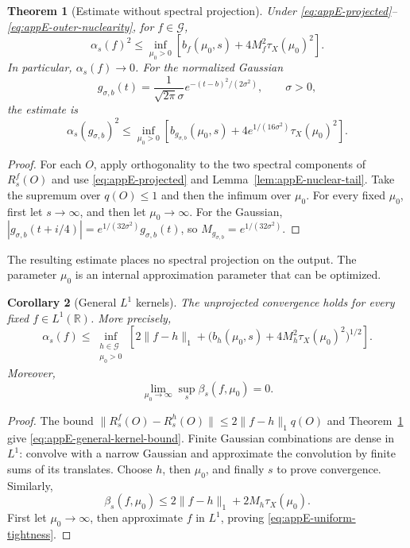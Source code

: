\documentclass[a4paper,11pt]{article}
\newtheorem{theorem}{Theorem}
\newtheorem{corollary}[theorem]{Corollary}
\theoremstyle{definition}
\begin{document}
\begin{theorem}[Estimate without spectral projection]
\label{thm:appE-uncut-bound}
Under \eqref{eq:appE-projected}--\eqref{eq:appE-outer-nuclearity}, for $f\in\mathcal G$,
\begin{equation}
 \alpha_s(f)^2\le
 \inf_{\mu_0>0}\left[
 b_f(\mu_0,s)+4M_f^2\tau_X(\mu_0)^2\right].
 \label{eq:appE-uncut-bound}
\end{equation}
In particular, $\alpha_s(f)\to0$. For the normalized Gaussian
\[
 g_{\sigma,b}(t)=\frac1{\sqrt{2\pi}\sigma}
 e^{-(t-b)^2/(2\sigma^2)},\qquad\sigma>0,
\]
the estimate is
\begin{equation}
 \alpha_s(g_{\sigma,b})^2\le
 \inf_{\mu_0>0}\left[
 b_{g_{\sigma,b}}(\mu_0,s)
 +4e^{1/(16\sigma^2)}\tau_X(\mu_0)^2\right].
 \label{eq:appE-gaussian-bound}
\end{equation}
\end{theorem}
\begin{proof}
For each $O$, apply orthogonality to the two spectral components of $R_s^f(O)$ and use \eqref{eq:appE-projected} and Lemma~\ref{lem:appE-nuclear-tail}. Take the supremum over $q(O)\le1$ and then the infimum over $\mu_0$. For every fixed $\mu_0$, first let $s\to\infty$, and then let $\mu_0\to\infty$.
For the Gaussian,
$|g_{\sigma,b}(t+i/4)|=e^{1/(32\sigma^2)}g_{\sigma,b}(t)$,
so $M_{g_{\sigma,b}}=e^{1/(32\sigma^2)}$.
\end{proof}

The resulting estimate places no spectral projection on the output. The parameter $\mu_0$ is an internal approximation parameter that can be optimized.

\begin{corollary}[General $L^1$ kernels]
\label{cor:appE-L1-kernels}
The unprojected convergence holds for every fixed $f\in L^1(\mathbb R)$. More precisely,
\begin{equation}
 \alpha_s(f)\le
 \inf_{\substack{h\in\mathcal G\\\mu_0>0}}
 \left[2\|f-h\|_1+
 \bigl(b_h(\mu_0,s)+4M_h^2\tau_X(\mu_0)^2\bigr)^{1/2}\right].
 \label{eq:appE-general-kernel-bound}
\end{equation}
Moreover,
\begin{equation}
 \lim_{\mu_0\to\infty}\sup_s\beta_s(f,\mu_0)=0.
 \label{eq:appE-uniform-tightness}
\end{equation}
\end{corollary}
\begin{proof}
The bound
$\|R_s^f(O)-R_s^h(O)\|\le2\|f-h\|_1q(O)$
and Theorem~\ref{thm:appE-uncut-bound} give \eqref{eq:appE-general-kernel-bound}. Finite Gaussian combinations are dense in $L^1$: convolve with a narrow Gaussian and approximate the convolution by finite sums of its translates. Choose $h$, then $\mu_0$, and finally $s$ to prove convergence.
Similarly,
\[
 \beta_s(f,\mu_0)\le2\|f-h\|_1+2M_h\tau_X(\mu_0).
\]
First let $\mu_0\to\infty$, then approximate $f$ in $L^1$, proving \eqref{eq:appE-uniform-tightness}.
\end{proof}
\end{document}
